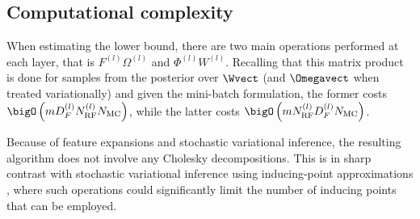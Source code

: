


\subsection{Computational complexity}

When estimating the lower bound, there are two main operations performed at each layer, that is $F^{(l)} \Omega^{(l)}$ and $\Phi^{(l)} W^{(l)}$.
Recalling that this matrix product is done for samples from the posterior over $\Wvect$ (and $\Omegavect$ when treated variationally) and given the mini-batch formulation, the former costs $\bigO\left(m  D_F^{(l)} N_{\mathrm{RF}}^{(l)}  N_{\mathrm{MC}}\right)$, while the latter costs $\bigO\left(m  N_{\mathrm{RF}}^{(l)}  D_F^{(l)}  N_{\mathrm{MC}}\right)$.

Because of feature expansions and stochastic variational inference, the resulting algorithm does not involve any Cholesky decompositions. This is in sharp contrast with stochastic variational inference using inducing-point approximations  \citep[see e.g.~][]{Dai15,Bui16}, where such operations could significantly limit the number of inducing points that can be employed.
